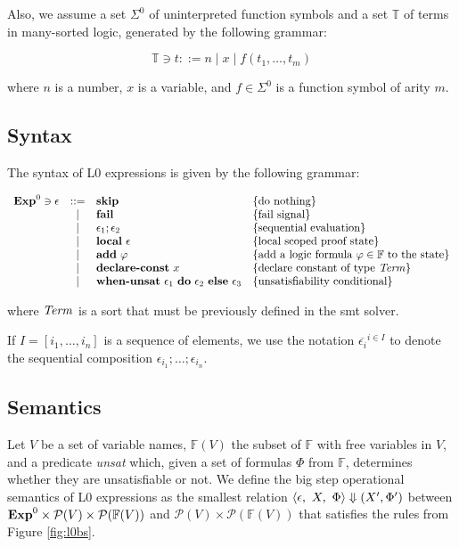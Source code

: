 Also, we assume a set $\Sigma^{0}$ of uninterpreted function symbols and a set
$\mathbb{T}$ of terms in many-sorted logic, generated by the following grammar:

\[
\mathbb{T} \ni t ::= n \mid x \mid f(t_1, \ldots, t_m)
\]

where $n$ is a number, $x$ is a variable, and $f \in \Sigma^{0}$ is a function 
symbol of arity $m$.

\subsection{Syntax}

The syntax of L0 expressions is given by the following grammar:

\[
\begin{array}{rcll}
\mathbf{Exp}^{0} \ni \epsilon & ::= & \textbf{skip} & \{ \textrm{do nothing} \}\\
& | & \textbf{fail} & \{ \textrm{fail signal} \}\\
& | & \epsilon_1;\epsilon_2 & \{ \textrm{sequential evaluation} \}\\
& | & \textbf{local}~\epsilon & \{ \textrm{local scoped proof state} \}\\
& | & \textbf{add}~\varphi &  \{ \textrm{add a logic formula $\varphi \in \mathbb{F}$ to the state} \}\\
& | & \textbf{declare-const}~x &  \{ \textrm{declare constant of type $\mathit{Term}$} \}\\
& | & \textbf{when-unsat}~\epsilon_1~\textbf{do}~\epsilon_2~\textbf{else}~\epsilon_3 &  \{ \textrm{unsatisfiability conditional} \}\\
\end{array}
\]

where $\mathit{Term}$ is a sort that must be previously defined in the \acrshort{smt}
solver.

If $I = [i_1, \ldots, i_n]$ is a sequence of elements, we use the notation
$\overline{\epsilon_i}^{i \in I}$ to denote the sequential composition 
$\epsilon_{i_1};\dots;\epsilon_{i_n}$.

\subsection{Semantics}

Let $V$ be a set of variable names, $\mathbb{F}(V)$ the subset of $\mathbb{F}$ 
with free variables in $V$, and a predicate \textit{unsat} which, given a set of
formulas $\Phi$ from $\mathbb{F}$, determines whether they are unsatisfiable or
not.  We define the big step operational semantics of L0 expressions as the
smallest relation $\langle \epsilon,~X,~\Phi\rangle \Downarrow (X', \Phi')$ between $\mathbf{Exp}^{0} \times
\mathcal{P}(V) \times \mathcal{P}({\mathbb{F}(V)})$ and $\mathcal{P}(V) \times
\mathcal{P}({\mathbb{F}(V)})$ that satisfies the rules from Figure
\ref{fig:l0bs}.

